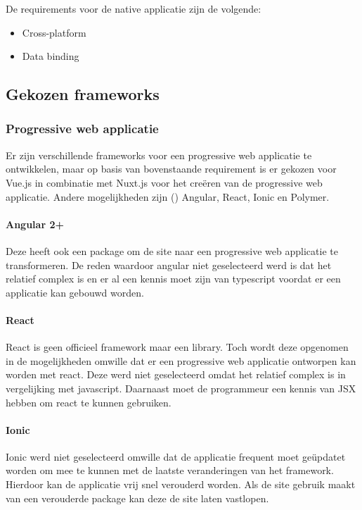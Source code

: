 De requirements voor de native applicatie zijn de volgende: 
\begin{itemize}
	\item Cross-platform
	\item Data binding
\end{itemize}

\subsection{Gekozen frameworks}
\subsubsection{Progressive web applicatie}
Er zijn verschillende frameworks voor een progressive web applicatie te ontwikkelen, maar op basis van bovenstaande requirement is er gekozen voor Vue.js in combinatie met Nuxt.js voor het creëren van de progressive web applicatie.
Andere mogelijkheden zijn (\cite{FRAMEWORKS_PROGRESSIVEWEBAPPS}) Angular, React, Ionic en Polymer.


\paragraph{Angular 2+}
Deze heeft ook een package om de site naar een progressive web applicatie te transformeren.
De reden waardoor angular niet geselecteerd werd is dat het relatief complex is en er al een kennis moet zijn van typescript voordat er een applicatie kan gebouwd worden.

\paragraph{React}
React is geen officieel framework maar een library. Toch wordt deze opgenomen in de mogelijkheden omwille dat er een progressive web applicatie ontworpen kan worden met react. Deze werd niet geselecteerd omdat het relatief complex is in vergelijking met javascript. Daarnaast moet de programmeur een kennis van JSX hebben om react te kunnen gebruiken.

\paragraph{Ionic}
Ionic werd niet geselecteerd omwille dat de applicatie frequent moet geüpdatet worden om mee te kunnen met de laatste veranderingen van het framework. Hierdoor kan de applicatie vrij snel verouderd worden. Als de site gebruik maakt van een verouderde package kan deze de site laten vastlopen.


